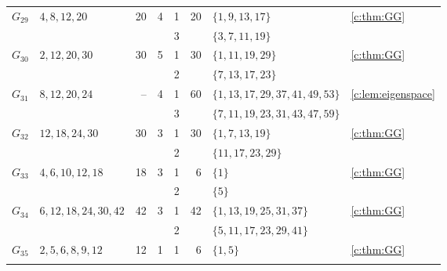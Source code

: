 \documentclass[10pt,a4paper]{amsart}
\theoremstyle{definition}
\begin{document}
\begin{longtable}{@{}lL{.24\textwidth}rrrrL{.26\textwidth}L{.14\textwidth}@{}}
$G_{29}$ & $4,\allowbreak 8,\allowbreak 12,\allowbreak 20$ & 20 & 4 & 1 & 20 & $\{1,\allowbreak 9,\allowbreak 13,\allowbreak 17\}$ & \cref{c:thm:GG} \\*
 &  &  &  & 3 &  & $\{3,\allowbreak 7,\allowbreak 11,\allowbreak 19\}$ &  \\
\midrule[.25pt]
$G_{30}$ & $2,\allowbreak 12,\allowbreak 20,\allowbreak 30$ & 30 & 5 & 1 & 30 & $\{1,\allowbreak 11,\allowbreak 19,\allowbreak 29\}$ & \cref{c:thm:GG} \\*
 &  &  &  & 2 &  & $\{7,\allowbreak 13,\allowbreak 17,\allowbreak 23\}$ &  \\
\midrule[.25pt]
$G_{31}$ & $8,\allowbreak 12,\allowbreak 20,\allowbreak 24$ & -- & 4 & 1 & 60 & $\{1,\allowbreak 13,\allowbreak 17,\allowbreak 29,\allowbreak 37,\allowbreak 41,\allowbreak 49,\allowbreak 53\}$ & \cref{c:lem:eigenspace} \\*
 &  &  &  & 3 &  & $\{7,\allowbreak 11,\allowbreak 19,\allowbreak 23,\allowbreak 31,\allowbreak 43,\allowbreak 47,\allowbreak 59\}$ &  \\
\midrule[.25pt]
$G_{32}$ & $12,\allowbreak 18,\allowbreak 24,\allowbreak 30$ & 30 & 3 & 1 & 30 & $\{1,\allowbreak 7,\allowbreak 13,\allowbreak 19\}$ & \cref{c:thm:GG} \\*
 &  &  &  & 2 &  & $\{11,\allowbreak 17,\allowbreak 23,\allowbreak 29\}$ &  \\
\midrule[.25pt]
$G_{33}$ & $4,\allowbreak 6,\allowbreak 10,\allowbreak 12,\allowbreak 18$ & 18 & 3 & 1 & 6 & $\{1\}$ & \cref{c:thm:GG} \\*
 &  &  &  & 2 &  & $\{5\}$ &  \\
\midrule[.25pt]
$G_{34}$ & $6,\allowbreak 12,\allowbreak 18,\allowbreak 24,\allowbreak 30,\allowbreak 42$ & 42 & 3 & 1 & 42 & $\{1,\allowbreak 13,\allowbreak 19,\allowbreak 25,\allowbreak 31,\allowbreak 37\}$ & \cref{c:thm:GG} \\*
 &  &  &  & 2 &  & $\{5,\allowbreak 11,\allowbreak 17,\allowbreak 23,\allowbreak 29,\allowbreak 41\}$ &  \\
\midrule[.25pt]
$G_{35}$ & $2,\allowbreak 5,\allowbreak 6,\allowbreak 8,\allowbreak 9,\allowbreak 12$ & 12 & 1 & 1 & 6 & $\{1,\allowbreak 5\}$ & \cref{c:thm:GG} \\
\midrule[.25pt]

\end{longtable}
\end{document}
